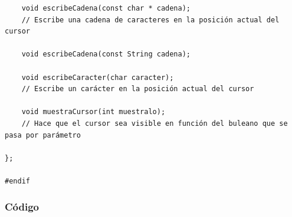 \documentclass[11pt,twoside]{book}
\begin{document}
\begin{lstlisting}
    void escribeCadena(const char * cadena);
    // Escribe una cadena de caracteres en la posición actual del cursor

    void escribeCadena(const String cadena);
    
    void escribeCaracter(char caracter);
    // Escribe un carácter en la posición actual del cursor

    void muestraCursor(int muestralo);
    // Hace que el cursor sea visible en función del buleano que se pasa por parámetro

};

#endif
\end{lstlisting}

\subsubsection{Código}
\end{document}
